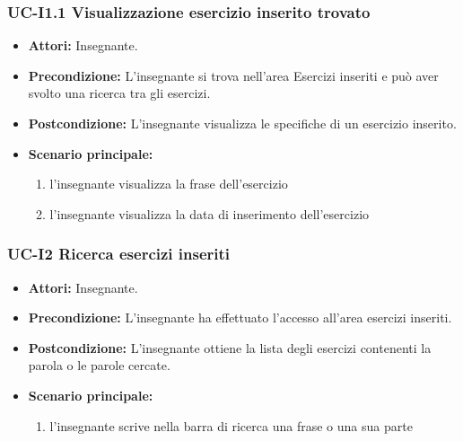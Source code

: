 \subsubsection{UC-I1.1 Visualizzazione esercizio inserito trovato}
\begin{itemize}
\item \textbf{Attori: }Insegnante.
		\item \textbf{Precondizione: }L'insegnante si trova nell'area Esercizi inseriti e può aver svolto una ricerca tra gli esercizi.
		\item \textbf{Postcondizione: }L'insegnante visualizza le specifiche di un esercizio inserito. 
		\item \textbf{Scenario principale:}
		\begin{enumerate}
			\item l'insegnante visualizza la frase dell'esercizio
			\item l'insegnante visualizza la data di inserimento dell'esercizio
		\end{enumerate}
	\end{itemize}

\subsubsection{UC-I2 Ricerca esercizi inseriti}
\begin{itemize}
	\item \textbf{Attori:} Insegnante.
	\item \textbf{Precondizione:} L'insegnante ha effettuato l'accesso all'area esercizi inseriti.
	\item \textbf{Postcondizione:} L'insegnante ottiene la lista degli esercizi contenenti la parola o le parole cercate.
	\item \textbf{Scenario principale:}
		\begin{enumerate}
				\item l'insegnante scrive nella barra di ricerca una frase o una sua parte
		\end{enumerate}
\end{itemize}

